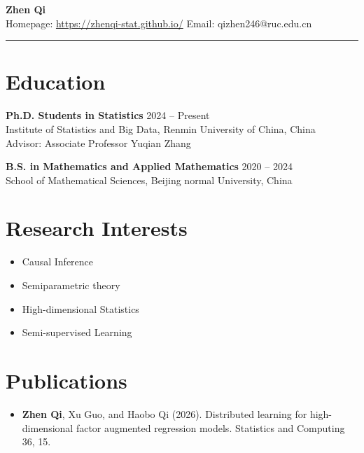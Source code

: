 \documentclass[11pt]{article}
\begin{document}
\begin{center}
    {\LARGE \textbf{Zhen Qi}} \\
    \vspace{20pt}
    Homepage: \url{https://zhenqi-stat.github.io/} \quad
    \hfill Email: qizhen246@ruc.edu.cn
\end{center}

\hrule

\vspace{10pt}

\noindent

\section*{Education}

\noindent
\textbf{Ph.D. Students in Statistics} \hfill 2024 -- Present \\
Institute of Statistics and Big Data, Renmin University of China, China \\
Advisor: Associate Professor Yuqian Zhang

\vspace{5pt}

\noindent
\textbf{B.S. in Mathematics and Applied Mathematics} \hfill 2020 -- 2024 \\
School of Mathematical Sciences, Beijing normal University, China

\vspace{5pt}

\section*{Research Interests}

\begin{itemize}
    \item Causal Inference
    \item Semiparametric theory
    \item High-dimensional Statistics
    \item Semi-supervised Learning
\end{itemize}

\section*{Publications}

\begin{itemize}
    \item \textbf{Zhen Qi}, Xu Guo, and Haobo Qi (2026). Distributed learning for high-dimensional factor augmented regression models. Statistics and Computing 36, 15.
\end{itemize}
\end{document}
